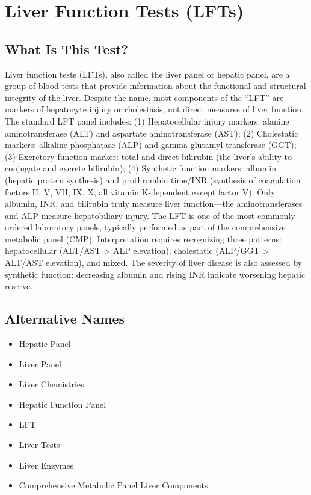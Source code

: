 \chapter{Liver Function Tests (LFTs)}

\section*{What Is This Test?}
Liver function tests (LFTs), also called the liver panel or hepatic panel, are a group of blood tests that provide information about the functional and structural integrity of the liver. Despite the name, most components of the ``LFT'' are markers of hepatocyte injury or cholestasis, not direct measures of liver function. The standard LFT panel includes: (1) Hepatocellular injury markers: alanine aminotransferase (ALT) and aspartate aminotransferase (AST); (2) Cholestatic markers: alkaline phosphatase (ALP) and gamma-glutamyl transferase (GGT); (3) Excretory function marker: total and direct bilirubin (the liver's ability to conjugate and excrete bilirubin); (4) Synthetic function markers: albumin (hepatic protein synthesis) and prothrombin time/INR (synthesis of coagulation factors II, V, VII, IX, X, all vitamin K-dependent except factor V). Only albumin, INR, and bilirubin truly measure liver function---the aminotransferases and ALP measure hepatobiliary injury. The LFT is one of the most commonly ordered laboratory panels, typically performed as part of the comprehensive metabolic panel (CMP). Interpretation requires recognizing three patterns: hepatocellular (ALT/AST > ALP elevation), cholestatic (ALP/GGT > ALT/AST elevation), and mixed. The severity of liver disease is also assessed by synthetic function: decreasing albumin and rising INR indicate worsening hepatic reserve.

\section*{Alternative Names}
\begin{itemize}
  \item Hepatic Panel
  \item Liver Panel
  \item Liver Chemistries
  \item Hepatic Function Panel
  \item LFT
  \item Liver Tests
  \item Liver Enzymes
  \item Comprehensive Metabolic Panel Liver Components
\end{itemize}
